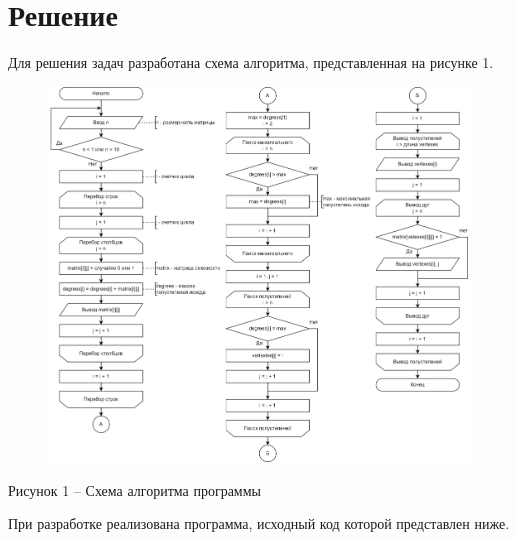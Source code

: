 \documentclass[a4paper,14pt]{extarticle}
\begin{document}
  \newpage
  \section*{\hspace{12.5mm}Решение}

  Для решения задач разработана схема алгоритма, представленная на рисунке 1.

  \begin{figure}[h]
    \centering
    \includegraphics[width=1\linewidth]{images/scheme.png}
  \end{figure}
  \begin{center}
    Рисунок 1 – Схема алгоритма программы
  \end{center}

  При разработке реализована программа, исходный код которой представлен ниже.

  \begingroup
    \linespread{1}
\end{document}
